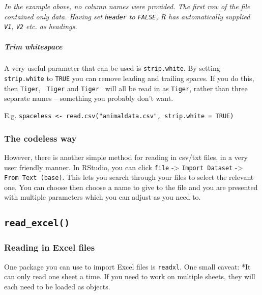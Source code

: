 \documentclass[
]{article}
\begin{document}
\emph{In the example above, no column names were provided. The first row
of the file contained only data. Having set \texttt{header} to
\texttt{FALSE}, R has automatically supplied \texttt{V1}, \texttt{V2}
etc. as headings.}

\hypertarget{trim-whitespace}{%
\subparagraph{Trim whitespace}\label{trim-whitespace}}

A very useful parameter that can be used is \texttt{strip.white}. By
setting \texttt{strip.white} to \texttt{TRUE} you can remove leading and
trailing spaces. If you do this, then
\texttt{\textquotesingle{}Tiger\textquotesingle{}},
\texttt{\textquotesingle{}\ Tiger\textquotesingle{}} and
\texttt{\textquotesingle{}Tiger\ \textquotesingle{}} will all be read in
as \texttt{\textquotesingle{}Tiger\textquotesingle{}}, rather than three
separate names -- something you probably don't want.

E.g.
\texttt{spaceless\ \textless{}-\ read.csv("animaldata.csv",\ strip.white\ =\ TRUE)}

\n
\n

\hypertarget{the-codeless-way}{%
\subsubsection{The codeless way}\label{the-codeless-way}}

However, there is another simple method for reading in csv/txt files, in
a very user friendly manner. In RStudio, you can click \texttt{file}
-\textgreater{} \texttt{Import\ Dataset} -\textgreater{}
\texttt{From\ Text\ (base)}. This lets you search through your files to
select the relevant one. You can choose then choose a name to give to
the file and you are presented with multiple parameters which you can
adjust as you need to.

\n
\n
\n

\hypertarget{read_excel}{%
\subsection{\texorpdfstring{\texttt{read\_excel()}}{read\_excel()}}\label{read_excel}}

\hypertarget{reading-in-excel-files}{%
\subsubsection{Reading in Excel files}\label{reading-in-excel-files}}

One package you can use to import Excel files is \texttt{readxl}. One
small caveat: *It can only read one sheet a time. If you need to work on
multiple sheets, they will each need to be loaded as objects.
\end{document}
